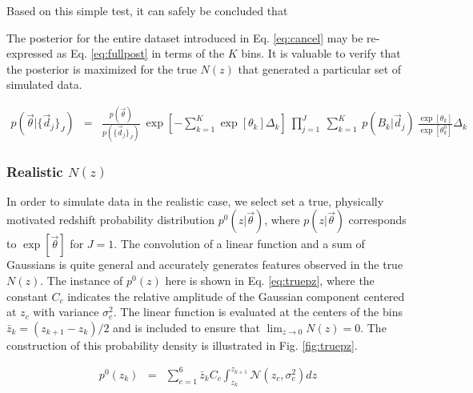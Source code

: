 \documentclass[preprint]{aastex}
\begin{document}
Based on this simple test, it can safely be concluded that 

The posterior for the entire dataset introduced in Eq. \ref{eq:cancel} may be re-expressed as Eq. \ref{eq:fullpost} in terms of the $K$ bins.  It is valuable to verify that the posterior is maximized for the true $N(z)$ that generated a particular set of simulated data.

\begin{eqnarray}
\label{eq:fullpost}
p(\vec{\theta}|\{\vec{d}_{j}\}_{J}) &=& \frac{p(\vec{\theta})}{p(\{\vec{d}_{j}\}_{J})}\ \exp\left[-\sum_{k=1}^{K}\exp[\theta_{k}]\Delta_{k}\right]\ \prod_{j=1}^{J}\ \sum_{k=1}^{K}\ p(B_{k}|\vec{d}_{j})\ \frac{\exp[\theta_{k}]}{\exp[\theta_{k}^{0}]}\Delta_{k}
\end{eqnarray}

\subsubsection{Realistic $N(z)$}
\label{sec:realnz}

In order to simulate data in the realistic case, we select set a true, physically motivated redshift probability distribution $p^{0}(z|\vec{\theta})$, where $p(z|\vec{\theta})$ corresponds to $\exp[\vec{\theta}]$ for $J=1$.  The convolution of a linear function and a sum of Gaussians is quite general and accurately generates features observed in the true $N(z)$.  The instance of $p^{0}(z)$ here is shown in Eq. \ref{eq:truepz}, where the constant $C_{c}$ indicates the relative amplitude of the Gaussian component centered at $z_{c}$ with variance $\sigma_{c}^{2}$.  The linear function is evaluated at the centers of the bins $\bar{z}_{k}=(z_{k+1}-z_{k})/2$ and is included to ensure that $\lim_{z\to0}N(z)=0$.  The construction of this probability density is illustrated in Fig. \ref{fig:truepz}.  %

\begin{eqnarray}
\label{eq:truepz}
p^{0}(z_{k}) &=& \sum_{c=1}^{6}\bar{z}_{k}C_{c}\int_{z_{k}}^{z_{k+1}} \mathcal{N}(z_{c},\sigma^{2}_{c})dz
\end{eqnarray}
\end{document}
